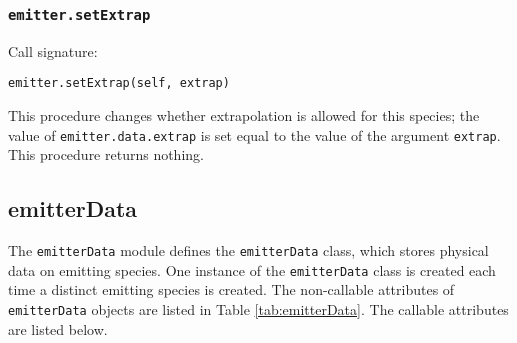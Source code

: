 \documentclass[12pt]{article}
\begin{document}
\subsubsection{\texttt{emitter.setExtrap}}

Call signature:

\begin{verbatim}
emitter.setExtrap(self, extrap)
\end{verbatim}

This procedure changes whether extrapolation is allowed for this species; the value of \verb=emitter.data.extrap= is set equal to the value of the argument \verb=extrap=. This procedure returns nothing.


\clearpage

\subsection{emitterData}
\label{sec:emitterData}

The \verb=emitterData= module defines the \verb=emitterData= class, which stores physical data on emitting species. One instance of the \verb=emitterData= class is created each time a distinct emitting species is created. The non-callable attributes of \verb=emitterData= objects are listed in Table \ref{tab:emitterData}. The callable attributes are listed below.
\end{document}
